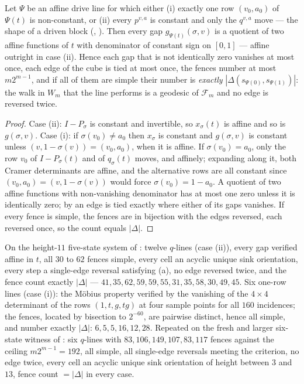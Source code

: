 \begin{theorem}\label{mw:monotone}
Let $\Psi$ be an affine drive line for which either
(i) exactly one row $(v_0,a_0)$ of $\Psi(t)$ is non-constant, or
(ii) every $p^{v,a}$ is constant and only the $q^{v,a}$ move --- the shape of
a driven block (, ).
Then every gap $g_{\Psi(t)}(\sigma,v)$ is a quotient of two affine functions
of $t$ with denominator of constant sign on $[0,1]$ --- affine outright in
case (ii). Hence each gap that is not identically zero vanishes at most once,
each edge of the cube is tied at most once, the fences number at most
$m2^{m-1}$, and if all of them are simple their number is \emph{exactly}
$|\Delta(s_{\Psi(0)},s_{\Psi(1)})|$: the walk in $W_m$ that the line performs
is a geodesic of $\mathcal F_m$ and no edge is reversed twice.
\end{theorem}

\begin{proof}
Case (ii): $I-P_\sigma$ is constant and invertible, so $x_\sigma(t)$ is affine
and so is $g(\sigma,v)$. Case (i): if $\sigma(v_0)\ne a_0$ then $x_\sigma$ is
constant and $g(\sigma,v)$ is constant unless $(v,1-\sigma(v))=(v_0,a_0)$,
when it is affine. If $\sigma(v_0)=a_0$, only the row $v_0$ of
$I-P_\sigma(t)$ and of $q_\sigma(t)$ moves, and affinely; expanding along it,
both Cramer determinants are affine, and the alternative rows are all
constant since $(v_0,a_0)=(v,1-\sigma(v))$ would force $\sigma(v_0)=1-a_0$.
A quotient of two affine functions with non-vanishing denominator has at most
one zero unless it is identically zero; by  an edge is tied
exactly where either of its gaps vanishes. If every fence is simple, the
fences are in bijection with the edges reversed, each reversed once, so the
count equals $|\Delta|$.
\end{proof}

\begin{remark}\label{mw:verified}
On the height-$11$ five-state system of : twelve
$q$-lines (case (ii)), every gap verified affine in $t$, all $30$ to $62$
fences simple, every cell an acyclic unique sink orientation, every step a
single-edge reversal satisfying (a), no edge reversed twice,
and the fence count exactly $|\Delta|$ --- $41,35,62,59,59,55,31,35,58,30,49,45$.
Six one-row lines (case (i)): the M\"obius property verified by the vanishing
of the $4\times4$ determinant of the rows $(1,t,g,tg)$ at four sample points
for all $160$ incidences; the fences, located by bisection to $2^{-60}$, are
pairwise distinct, hence all simple, and number exactly $|\Delta|$:
$6,5,5,16,12,28$. Repeated on the fresh and larger six-state witness of
: six $q$-lines with $83,106,149,107,83,117$ fences against the
ceiling $m2^{m-1}=192$, all simple, all single-edge reversals meeting the
criterion, no edge twice, every cell an acyclic unique sink orientation of
height between $3$ and $13$, fence count $=|\Delta|$ in every case.
\end{remark}

